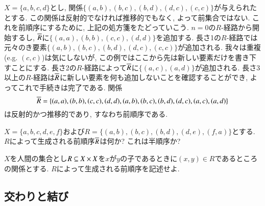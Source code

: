 \begin{example}
$X=\{a,b,c,d\}$とし, 関係$\{(a,b),(b,c),(b,d),(d,c),(c,c)\}$が与えられたとする. この関係は反射的でなければ推移的でもなく, よって前集合ではない. これを前順序にするために, 上記の処方箋をたどっていこう. $n=0$の$R$-経路から開始するし, $\ol{R}$に$\{(a,a), (b,b), (c,c), (d,d)\}$を追加する. 長さ1の$R$-経路では元々のき要素$\{(a,b),(b,c),(b,d),(d,c),(c,c)\}$が追加される. 我々は重複(e.g. $(c,c)$)は気にしないが, この例ではここから先は新しい要素だけを書き下すことにする. 長さ2の$R$-経路によって$\ol{R}$に$\{(a,c),(a,d)\}$が追加される. 長さ3以上の$R$-経路は$\ol{R}$に新しい要素を何も追加しないことを確認することができ, よってこれで手続きは完了である. 関係$$\ol{R}=\{(a,a), (b,b), (c,c), (d,d), (a,b), (b,c), (b,d), (d,c), (a,c), (a,d)\}$$は反射的かつ推移的であり, すなわち前順序である.

\end{example}

\begin{exercise}

$X=\{a,b,c,d,e,f\}$および$R=\{(a,b),(b,c),(b,d),(d,e),(f,a)\}$とする.
\sexc $R$によって生成される前順序$\ol{R}$は何か?
\next これは半順序か?
\endsexc
\end{exercise}

\begin{exercise}
$X$を人間の集合とし$R\ss X\times X$を$x$が$y$の子であるときに$(x,y)\in R$であるところの関係とする. $R$によって生成される前順序を記述せよ.
\end{exercise}


\subsection{交わりと結び}\label{sec:meets and joins}


